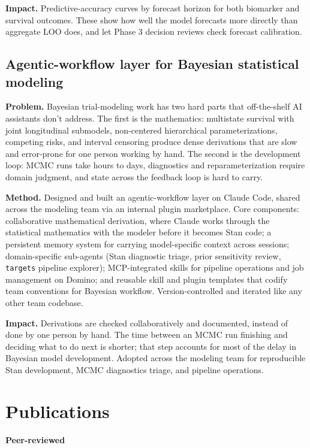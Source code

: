 \documentclass[11pt]{article}
\begin{document}
\textbf{Impact.} Predictive-accuracy curves by forecast horizon for both biomarker and survival outcomes. These show how well the model forecasts more directly than aggregate LOO does, and let Phase 3 decision reviews check forecast calibration.

\subsection*{Agentic-workflow layer for Bayesian statistical modeling}

\textbf{Problem.} Bayesian trial-modeling work has two hard parts that off-the-shelf AI assistants don't address. The first is the mathematics: multistate survival with joint longitudinal submodels, non-centered hierarchical parameterizations, competing risks, and interval censoring produce dense derivations that are slow and error-prone for one person working by hand. The second is the development loop: MCMC runs take hours to days, diagnostics and reparameterization require domain judgment, and state across the feedback loop is hard to carry.

\textbf{Method.} Designed and built an agentic-workflow layer on Claude Code, shared across the modeling team via an internal plugin marketplace. Core components: collaborative mathematical derivation, where Claude works through the statistical mathematics with the modeler before it becomes Stan code; a persistent memory system for carrying model-specific context across sessions; domain-specific sub-agents (Stan diagnostic triage, prior sensitivity review, \texttt{targets} pipeline explorer); MCP-integrated skills for pipeline operations and job management on Domino; and reusable skill and plugin templates that codify team conventions for Bayesian workflow. Version-controlled and iterated like any other team codebase.

\textbf{Impact.} Derivations are checked collaboratively and documented, instead of done by one person by hand. The time between an MCMC run finishing and deciding what to do next is shorter; that step accounts for most of the delay in Bayesian model development. Adopted across the modeling team for reproducible Stan development, MCMC diagnostics triage, and pipeline operations.

\section*{Publications}

\textbf{Peer-reviewed}
\end{document}
